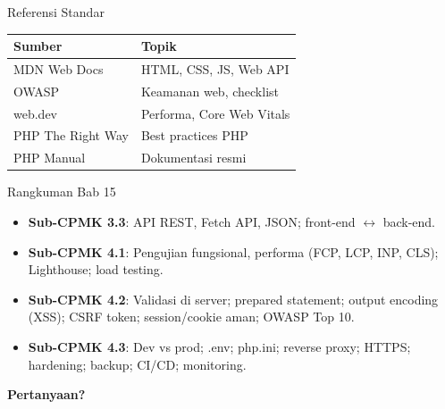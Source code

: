 \documentclass[handout]{beamer}
\begin{document}
\begin{frame}{Referensi Standar}
	\begin{tabular}{|l|l|}
		\hline
		\textbf{Sumber} & \textbf{Topik} \\
		\hline
		MDN Web Docs & HTML, CSS, JS, Web API \\
		\hline
		OWASP & Keamanan web, checklist \\
		\hline
		web.dev & Performa, Core Web Vitals \\
		\hline
		PHP The Right Way & Best practices PHP \\
		\hline
		PHP Manual & Dokumentasi resmi \\
		\hline
	\end{tabular}
\end{frame}

\begin{frame}{Rangkuman Bab 15}
	\begin{itemize}
		\item \textbf{Sub-CPMK 3.3}: API REST, Fetch API, JSON; front-end $\leftrightarrow$ back-end.
		\item \textbf{Sub-CPMK 4.1}: Pengujian fungsional, performa (FCP, LCP, INP, CLS); Lighthouse; load testing.
		\item \textbf{Sub-CPMK 4.2}: Validasi di server; prepared statement; output encoding (XSS); CSRF token; session/cookie aman; OWASP Top 10.
		\item \textbf{Sub-CPMK 4.3}: Dev vs prod; .env; php.ini; reverse proxy; HTTPS; hardening; backup; CI/CD; monitoring.
	\end{itemize}
\end{frame}

\begin{frame}{}
	\centering
	\vfill
	\textbf{\Large Pertanyaan?}
	\vfill
\end{frame}
\end{document}
